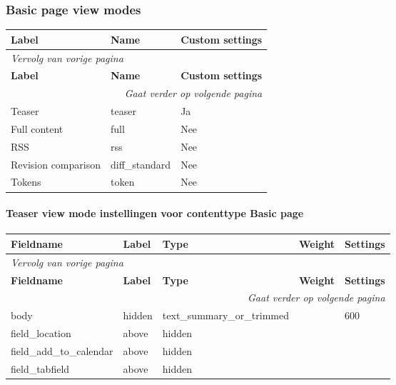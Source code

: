 \subsubsection{Basic page view modes}
  \begin{longtable}{| p{5.00cm}|p{5.00cm}|p{5.00cm}|}
  \hline
  \rowcolor{tableheader}
  \textbf{Label} & \textbf{Name} & \textbf{Custom settings}  \tabularnewline
  \hline
\endfirsthead
\multicolumn{3}{l}{\textit{Vervolg van vorige pagina}} \\
\hline
\rowcolor{tableheader}
  \textbf{Label} & \textbf{Name} & \textbf{Custom settings}  \tabularnewline
  \hline
\hline
\endhead
\multicolumn{3}{r}{\textit{Gaat verder op volgende pagina}} \\
\endfoot
\hline
\endlastfoot
  Teaser & teaser & Ja  \tabularnewline
  \hline
  Full content & full & Nee  \tabularnewline
  \hline
  RSS & rss & Nee  \tabularnewline
  \hline
  Revision comparison & diff\_standard & Nee  \tabularnewline
  \hline
  Tokens & token & Nee  \tabularnewline
  \hline
  \end{longtable}

\paragraph{Teaser view mode instellingen voor contenttype Basic page }

  \begin{longtable}{| p{3.00cm}|p{3.00cm}|p{3.00cm}|p{3.00cm}|p{3.00cm}|}
  \hline
  \rowcolor{tableheader}
  \textbf{Fieldname} & \textbf{Label} & \textbf{Type} & \textbf{Weight} & \textbf{Settings}  \tabularnewline
  \hline
\endfirsthead
\multicolumn{5}{l}{\textit{Vervolg van vorige pagina}} \\
\hline
\rowcolor{tableheader}
  \textbf{Fieldname} & \textbf{Label} & \textbf{Type} & \textbf{Weight} & \textbf{Settings}  \tabularnewline
  \hline
\hline
\endhead
\multicolumn{5}{r}{\textit{Gaat verder op volgende pagina}} \\
\endfoot
\hline
\endlastfoot
  body & hidden & text\_summary\_or\_trimmed &   & 600  \tabularnewline
  \hline
  field\_location & above & hidden &   &    \tabularnewline
  \hline
  field\_add\_to\_calendar & above & hidden &   &    \tabularnewline
  \hline
  field\_tabfield & above & hidden &   &    \tabularnewline
  \hline
  \end{longtable}


